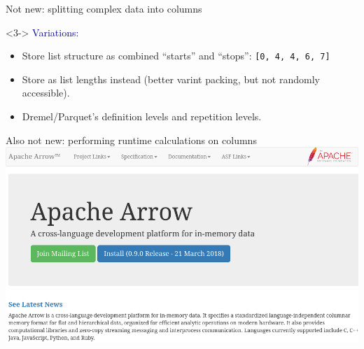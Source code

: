 \documentclass[aspectratio=169]{beamer}
\begin{document}
\begin{frame}{Not new: splitting complex data into columns}
\vspace{0.1 cm}
\begin{uncoverenv}<3->
\textcolor{darkblue}{\large Variations:}
\begin{itemize}
\item Store list structure as combined ``starts'' and ``stops'': {\tt\small [0, 4, 4, 6, 7]}
\item Store as list lengths instead (better varint packing, but not randomly accessible).
\item Dremel/Parquet's definition levels and repetition levels.
\end{itemize}
\end{uncoverenv}
\end{frame}

\begin{frame}{Also not new: performing runtime calculations on columns}
\vspace{0.3 cm}
\includegraphics[width=\linewidth]{apache-arrow.png}
\end{frame}
\end{document}
